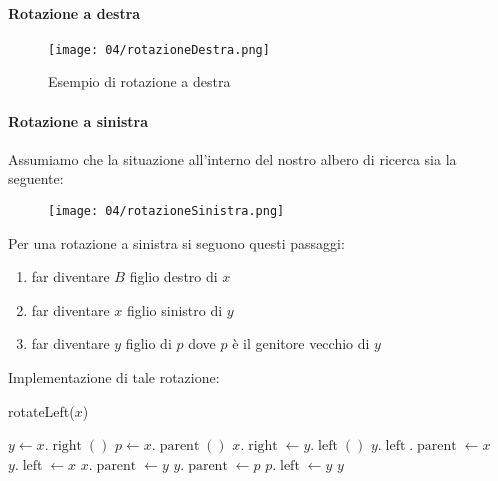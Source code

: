         \paragraph{Rotazione a destra}
            \begin{figure}[H]
                \centering
                \texttt{[image: 04/rotazioneDestra.png]}
                \caption{Esempio di rotazione a destra}
            \end{figure}
        \newpage
        \paragraph{Rotazione a sinistra}
            Assumiamo che la situazione all'interno del nostro albero di ricerca sia la seguente:

            \begin{wrapfigure}{l}{0.1\textwidth}
                \texttt{[image: 04/rotazioneSinistra.png]}
            \end{wrapfigure}
            Per una rotazione a sinistra si seguono questi passaggi:
            \begin{enumerate}
                \item far diventare $B$ figlio destro di $x$
                \item far diventare $x$ figlio sinistro di $y$
                \item far diventare $y$ figlio di $p$ dove $p$ è il genitore vecchio di $y$
            \end{enumerate}
            Implementazione di tale rotazione:
            \begin{algorithm}[H]
                \caption{rotateLeft(\Tree $ x $)}
                \begin{algorithmic}
                    \State \Tree $ y \gets x.\operatorname{right}()$
                    \State \Tree $ p \gets x.\operatorname{parent}()$
                    \State $ x.\operatorname{right} \gets y.\operatorname{left}()$
                        \State $ y.\operatorname{left}.\operatorname{parent} \gets x $
                    \EndIf
                    \State $ y.\operatorname{left} \gets x $
                    \State $ x.\operatorname{parent} \gets y $
                    \State $ y.\operatorname{parent} \gets p $
                            \State $ p.\operatorname{left} \gets y $
                        \EndIf
                    \EndIf
                    \Return $ y $
                \end{algorithmic}
            \end{algorithm}
